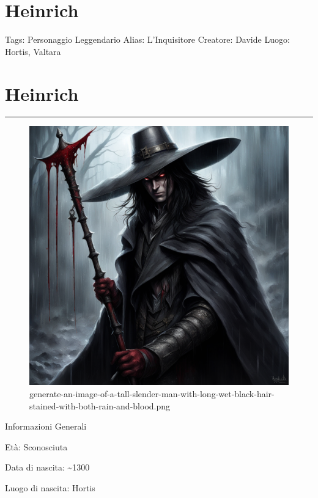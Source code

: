 \section{Heinrich}\label{heinrich}

Tags: Personaggio Leggendario Alias: L'Inquisitore Creatore: Davide
Luogo: Hortis, Valtara

\section{Heinrich}\label{heinrich-1}

\begin{center}\rule{0.5\linewidth}{0.5pt}\end{center}

\begin{figure}
\centering
\includegraphics{generate-an-image-of-a-tall-slender-man-with-long-wet-black-hair-stained-with-both-rain-and-blood.png}
\caption{generate-an-image-of-a-tall-slender-man-with-long-wet-black-hair-stained-with-both-rain-and-blood.png}
\end{figure}

Informazioni Generali

Età: Sconosciuta

Data di nascita: \textasciitilde1300

Luogo di nascita: Hortis

